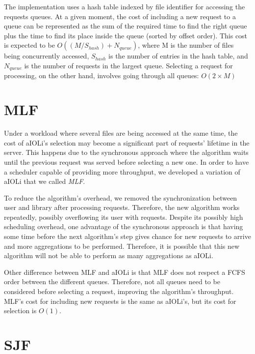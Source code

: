 The implementation uses a hash table indexed by file identifier for accessing the requests queues. 
At a given moment, the cost of including a new request to a queue can be represented as the sum of the required time to find the right queue plus the time to find its place inside the queue (sorted by offset order).  This cost is expected to be $O( (M / S_{hash}) + N_{queue} )$, where M is the number of files being concurrently accessed, $S_{hash}$ is the number of entries in the hash table, and $N_{queue}$ is the number of requests in the largest queue. Selecting a request for processing, on the other hand, involves going through all queues: $O( 2 \times M )$

\section{MLF}

Under a workload where several files are being accessed at the same time, the cost of aIOLi's selection may become a significant part of requests' lifetime in the server. This happens due to the synchronous approach where the algorithm waits until the previous request was served before selecting a new one. In order to have a scheduler capable of providing more throughput, we developed a variation of aIOLi that we called \emph{MLF}. 

To reduce the algorithm's overhead, we removed the synchronization between user and library after processing requests. Therefore, the new algorithm works repeatedly, possibly overflowing its user with requests. 
%
Despite its possibly high scheduling overhead, one advantage of the synchronous approach is that having some time before the next algorithm's step gives chance for new requests to arrive and more aggregations to be performed. Therefore, it is possible that this new algorithm will not be able to perform as many aggregations as aIOLi. 

Other difference between MLF and aIOLi is that MLF does not respect a FCFS order between the different queues. Therefore, not all queues need to be considered before selecting a request, improving the algorithm's throughput.
MLF's cost for including new requests is the same as aIOLi's, but its cost for selection is $O(1)$.

\section{SJF} \label{agios_sjf}

